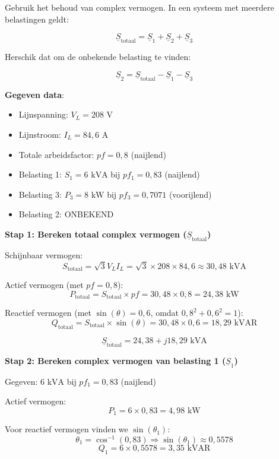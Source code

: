 \documentclass[a4paper,11pt]{article}
\begin{document}
\begin{oefenblok}

    Gebruik het behoud van complex vermogen. In een systeem met meerdere belastingen geldt:

    \[\underline{S}_{\text{totaal}} = \underline{S}_1 + \underline{S}_2 + \underline{S}_3\]

    Herschik dat om de onbekende belasting te vinden:

    \[\underline{S}_2 = \underline{S}_{\text{totaal}} - \underline{S}_1 - \underline{S}_3\]

    \textbf{Gegeven data}:
    \begin{itemize}
        \item Lijnspanning: $V_L = 208 \text{ V}$
        \item Lijnstroom: $I_L = 84{,}6 \text{ A}$
        \item Totale arbeidsfactor: $pf = 0{,}8$ (naijlend)
        \item Belasting 1: $S_1 = 6 \text{ kVA}$ bij $pf_1 = 0{,}83$ (naijlend)
        \item Belasting 3: $P_3 = 8 \text{ kW}$ bij $pf_3 = 0{,}7071$ (voorijlend)
        \item Belasting 2: ONBEKEND
    \end{itemize}

    \textbf{Stap 1: Bereken totaal complex vermogen ($\underline{S}_{\text{totaal}}$)}

    Schijnbaar vermogen:
    \[S_{\text{totaal}} = \sqrt{3} V_L I_L = \sqrt{3} \times 208 \times 84{,}6 \approx 30{,}48 \text{ kVA}\]

    Actief vermogen (met $pf = 0{,}8$):
    \[P_{\text{totaal}} = S_{\text{totaal}} \times pf = 30{,}48 \times 0{,}8 = 24{,}38 \text{ kW}\]

    Reactief vermogen (met $\sin(\theta) = 0{,}6$, omdat $0{,}8^2 + 0{,}6^2 = 1$):
    \[Q_{\text{totaal}} = S_{\text{totaal}} \times \sin(\theta) = 30{,}48 \times 0{,}6 = 18{,}29 \text{ kVAR}\]

    \[\underline{S}_{\text{totaal}} = 24{,}38 + j18{,}29 \text{ kVA}\]

    \textbf{Stap 2: Bereken complex vermogen van belasting 1 ($\underline{S}_1$)}

    Gegeven: $6 \text{ kVA}$ bij $pf_1 = 0{,}83$ (naijlend)

    Actief vermogen:
    \[P_1 = 6 \times 0{,}83 = 4{,}98 \text{ kW}\]

    Voor reactief vermogen vinden we $\sin(\theta_1)$:
    \[\theta_1 = \cos^{-1}(0{,}83) \Rightarrow \sin(\theta_1) \approx 0{,}5578\]
    \[Q_1 = 6 \times 0{,}5578 = 3{,}35 \text{ kVAR}\]


\end{oefenblok}
\end{document}
